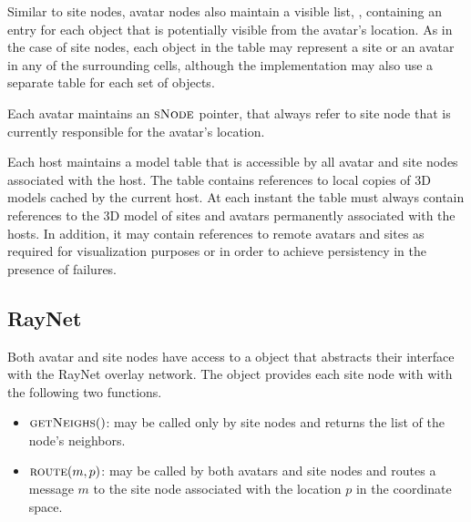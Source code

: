 


\dstruct{\vlist}

Similar to site nodes, avatar nodes also maintain a visible list,
\vlist, containing an entry for each object that is potentially
visible from the avatar's location. As in the case of site nodes, each
object in the table may represent a site or an avatar in any of the
surrounding cells, although the implementation may also use a separate
table for each set of objects.


\dstruct{\snode}

Each avatar maintains an $\textsc{sNode}$ pointer, that always refer to site
node that is currently responsible for the avatar's location.

\dstruct{\modtab}

Each host maintains a model table \modtab that is accessible by all
avatar and site nodes associated with the host. The table contains
references to local copies of 3D models cached by the current host. At
each instant the \modtab table must always contain references to the
3D model of sites and avatars permanently associated with the
hosts. In addition, it may contain references to remote avatars and
sites as required for visualization purposes or in order to achieve
persistency in the presence of failures.

\newcommand{\achange}{\ensuremath{\textsc{avChange}}\xspace}
\newcommand{\adesc}{\ensuremath{\textsc{avDesc}}\xspace}
\newcommand{\newsnode}{\ensuremath{\textsc{NewSiteNode}}\xspace}
\newcommand{\cursite}{\ensuremath{\textsc{curSite}}\xspace}


\subsection{RayNet}
Both avatar and site nodes have access to a \rn object that abstracts
their interface with the RayNet overlay network. The \rn object
provides each site node with with the following two functions.
\begin{itemize}
\item $\textsc{getNeighs}()$: may be called only by site nodes and returns the list
  of the node's neighbors.
\item 
$\textsc{route}(m, p)$: may be called by both avatars and site nodes and routes a
message $m$ to the site node associated with the location $p$ in the
coordinate space. 
\end{itemize}



